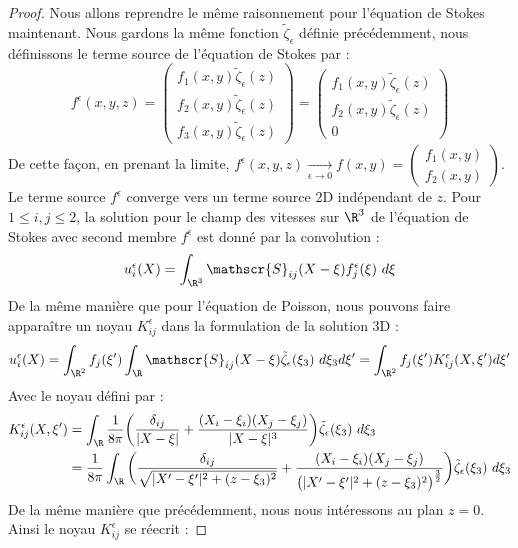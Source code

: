 \begin{proof}
    
Nous allons reprendre le même raisonnement pour l'équation de Stokes maintenant. Nous gardons la même fonction $\tilde{\zeta}_{\epsilon}$ définie précédemment, nous définissons le terme source de l'équation de Stokes par :
$$ f^{\epsilon}(x,y,z) = \begin{pmatrix}
    f_1(x,y)\tilde{\zeta}_{\epsilon}(z) \\
    f_2(x,y)\tilde{\zeta}_{\epsilon}(z) \\
    f_3(x,y)\tilde{\zeta}_{\epsilon}(z)
\end{pmatrix} = \begin{pmatrix}
    f_1(x,y)\tilde{\zeta}_{\epsilon}(z) \\
    f_2(x,y)\tilde{\zeta}_{\epsilon}(z) \\
    0
\end{pmatrix} $$
De cette façon, en prenant la limite, $f^{\epsilon}(x,y,z) \xrightarrow[\epsilon \to 0]{} f(x,y) = \begin{pmatrix}
    f_1(x,y) \\
    f_2(x,y)
\end{pmatrix}$. Le terme source $f^{\epsilon}$ converge vers un terme source 2D indépendant de $z$. 
Pour $1 \leq i,j \leq 2$, la solution pour le champ des vitesses sur $\R^3$ de l'équation de Stokes avec second membre $f^{\epsilon}$ est donné par la convolution :
$$ u^{\epsilon}_i(X) = \int_{\R^3} \mathscr{S}_{ij}(X-\xi)f_j^{\epsilon}(\xi) \  d \xi $$
De la même manière que pour l'équation de Poisson, nous pouvons faire apparaître un noyau $K_{ij}^{\epsilon}$ dans la formulation de la solution 3D :
$$ u^{\epsilon}_i(X) = \int_{\R^2} f_j(\xi') \int_{\R} \mathscr{S}_{ij}(X-\xi)\tilde{\zeta}_{\epsilon}(\xi_3) \  d \xi_3 d \xi ' = \int_{\R^2} f_j(\xi') K_{ij}^{\epsilon}(X,\xi') d \xi' $$
Avec le noyau défini par :
\begin{align*}
    K_{ij}^{\epsilon}(X,\xi') &= \int_{\R} \frac{1}{8\pi} \bigg( \frac{\delta_{ij}}{|X - \xi|} + \frac{(X_i - \xi_i)(X_j - \xi_j)}{|X - \xi|^3} \bigg)\tilde{\zeta}_{\epsilon}(\xi_3) \ d\xi_3 \\
    &= \frac{1}{8\pi} \int_{\R}  \bigg( \frac{\delta_{ij}}{\sqrt{|X' - \xi'|^2 + (z - \xi_3)^2}} + \frac{(X_i - \xi_i)(X_j - \xi_j)}{\big(|X' - \xi'|^2 + (z - \xi_3)^2\big)^{\frac{3}{2}}} \bigg) \tilde{\zeta}_{\epsilon}(\xi_3) \ d\xi_3
\end{align*}
De la même manière que précédemment, nous nous intéressons au plan $z = 0$. Ainsi le noyau $K_{ij}^{\epsilon}$ se réecrit : 

\end{proof}
